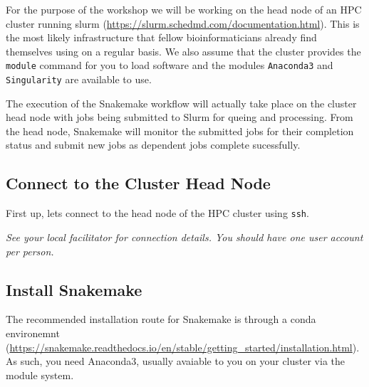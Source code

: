 For the purpose of the workshop we will be working on the head node of an HPC cluster running slurm (\url{https://slurm.schedmd.com/documentation.html}).
This is the most likely infrastructure that fellow bioinformaticians already find themselves using
on a regular basis. We also assume that the cluster provides the \texttt{module} command for you to
load software and the modules \texttt{Anaconda3} and \texttt{Singularity} are available to use.

The execution of the Snakemake workflow will actually take place on the cluster head node with jobs
being submitted to Slurm for queing and processing. From the head node, Snakemake will monitor the
submitted jobs for their completion status and submit new jobs as dependent jobs complete sucessfully.

\subsection{Connect to the Cluster Head Node}

\begin{steps}
First up, lets connect to the head node of the HPC cluster using \texttt{ssh}.

\emph{See your local facilitator for connection details. You should have one user account per person.}
\end{steps}

\subsection{Install Snakemake}

The recommended installation route for Snakemake is through a conda environemnt
(\url{https://snakemake.readthedocs.io/en/stable/getting_started/installation.html}). As such, you need
Anaconda3, usually avaiable to you on your cluster via the module system.

